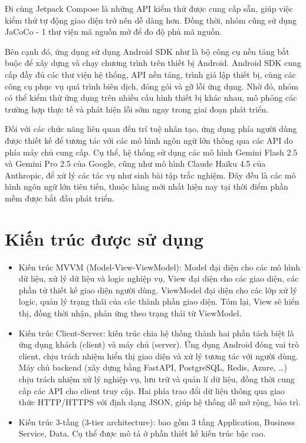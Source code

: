 \documentclass{uetgraduation}
\begin{document}
Đi cùng Jetpack Compose là những API kiểm thử được cung cấp sẵn,
giúp việc kiểm thử tự động giao diện trở nên dễ dàng hơn. Đồng thời,
nhóm cũng sử dụng JaCoCo - 1 thư viện mã nguồn mở để đo độ phủ mã nguồn.
\par
Bên cạnh đó, ứng dụng sử dụng Android SDK như là bộ 
công cụ nền tảng bắt buộc để xây dựng và chạy chương 
trình trên thiết bị Android. Android SDK cung cấp đầy 
đủ các thư viện hệ thống, API nền tảng, trình giả lập 
thiết bị, cùng các công cụ phục vụ quá trình biên dịch, 
đóng gói và gỡ lỗi ứng dụng. Nhờ đó, nhóm có thể kiểm thử 
ứng dụng trên nhiều cấu hình thiết bị khác nhau, mô phỏng các 
trường hợp thực tế và phát hiện lỗi sớm ngay trong giai 
đoạn phát triển.\par

Đối với các chức năng liên quan đến trí tuệ nhân tạo, 
ứng dụng phía người dùng được thiết kế để tương tác với 
các mô hình ngôn ngữ lớn thông qua các API do phía máy 
chủ cung cấp. Cụ thể, hệ thống sử dụng các mô hình 
Gemini Flash 2.5 và Gemini Pro 2.5 của Google, 
cũng như mô hình Claude Haiku 4.5 của Anthropic,
 để xử lý các tác vụ như sinh bài tập trắc nghiệm. 
 Đây đều là các mô hình ngôn ngữ lớn tiên tiến, 
 thuộc hàng mới nhất hiện nay tại thời điểm phần 
 mềm được bắt đầu phát triển.

\section{Kiến trúc được sử dụng}
\begin{itemize}
    \item Kiến trúc MVVM (Model-View-ViewModel): Model đại diện cho các mô hình dữ liệu, xử lý dữ liệu và logic nghiệp vụ, View đại diện cho các giao diện, các phần tử thiết kế giao diện người dùng. ViewModel đại diện cho các lớp xử lý logic, quản lý trạng thái của các thành phần giao diện. Tóm lại, View sẽ hiển thị, đồng thời nhận, phản ứng theo trạng thái từ ViewModel.
    \item Kiến trúc Client-Server: kiến trúc chia hệ thống thành hai phần tách biệt là ứng dụng khách (client) và máy chủ (server). Ứng dụng Android đóng vai trò client, chịu trách nhiệm hiển thị giao diện và xử lý tương tác với người dùng. Máy chủ backend (xây dựng bằng FastAPI, PostgreSQL, Redis, Azure, \ldots) chịu trách nhiệm xử lý nghiệp vụ, lưu trữ và quản lí dữ liệu, đồng thời cung cấp các API cho client truy cập. Hai phía trao đổi dữ liệu thông qua giao thức HTTP/HTTPS với định dạng JSON, giúp hệ thống dễ mở rộng, bảo trì.
    \item Kiến trúc 3-tầng (3-tier architecture): bao gồm 3 tầng Application, Business Service, Data. Cụ thể được mô tả ở phần thiết kế kiến trúc bậc cao.
\end{itemize}
\end{document}
